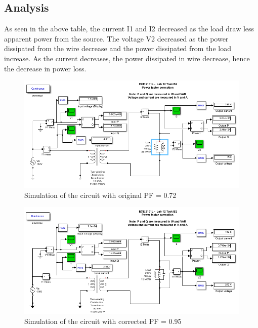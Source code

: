 \documentclass{article}
\begin{document}
\subsection*{Analysis}
As seen in the above table, the current I1 and I2 decreased as the load draw less apparent power from the source. The voltage V2 decreased as the power dissipated from the wire decrease and the power dissipated from the load increase. As the current decreases, the power dissipated in wire decrease, hence the decrease in power loss.
\newpage

\begin{figure}[H]
    \centering
        \includegraphics[width=\textwidth]{ECE2101L_Lab12_B2_0.72.png}
        \caption{Simulation of the circuit with original PF = 0.72}
\end{figure}
\begin{figure}[H]
    \centering
        \includegraphics[width=\textwidth]{ECE2101L_Lab12_B2_0.95.png}
        \caption{Simulation of the circuit with corrected PF = 0.95}
\end{figure}
\end{document}

